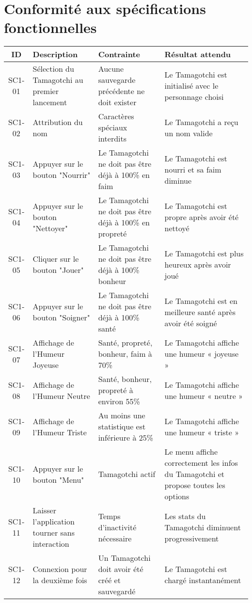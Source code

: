 \documentclass{cahier_de_recette}
\begin{document}
\section{Conformité aux spécifications fonctionnelles}
\begin{longtable}{|c|p{4cm}|p{4cm}|p{4cm}|}
\hline
\textbf{ID} & \textbf{Description} & \textbf{Contrainte} & \textbf{Résultat attendu} \\
\hline
SC1-01 & Sélection du Tamagotchi au premier lancement & Aucune sauvegarde précédente ne doit exister & Le Tamagotchi est initialisé avec le personnage choisi \\
\hline
SC1-02 & Attribution du nom & Caractères spéciaux interdits & Le Tamagotchi a reçu un nom valide \\
\hline
SC1-03 & Appuyer sur le bouton "Nourrir" & Le Tamagotchi ne doit pas être déjà à 100\% en faim & Le Tamagotchi est nourri et sa faim diminue \\
\hline
SC1-04 & Appuyer sur le bouton "Nettoyer" & Le Tamagotchi ne doit pas être déjà à 100\% en propreté & Le Tamagotchi est propre après avoir été nettoyé \\
\hline
SC1-05 & Cliquer sur le bouton "Jouer" & Le Tamagotchi ne doit pas être déjà à 100\% bonheur & Le Tamagotchi est plus heureux après avoir joué \\
\hline
SC1-06 & Appuyer sur le bouton "Soigner" & Le Tamagotchi ne doit pas être déjà à 100\% santé & Le Tamagotchi est en meilleure santé après avoir été soigné \\
\hline
SC1-07 & Affichage de l’Humeur Joyeuse & Santé, propreté, bonheur, faim à 70\% & Le Tamagotchi affiche une humeur « joyeuse » \\
\hline
SC1-08 & Affichage de l’Humeur Neutre & Santé, bonheur, propreté à environ 55\% & Le Tamagotchi affiche une humeur « neutre » \\
\hline
SC1-09 & Affichage de l’Humeur Triste & Au moins une statistique est inférieure à 25\% & Le Tamagotchi affiche une humeur « triste » \\
\hline
SC1-10 & Appuyer sur le bouton "Menu" & Tamagotchi actif & Le menu affiche correctement les infos du Tamagotchi et propose toutes les options \\
\hline
SC1-11 & Laisser l’application tourner sans interaction & Temps d'inactivité nécessaire & Les stats du Tamagotchi diminuent progressivement \\
\hline
SC1-12 & Connexion pour la deuxième fois & Un Tamagotchi doit avoir été créé et sauvegardé & Le Tamagotchi est chargé instantanément \\

\end{longtable}
\end{document}
